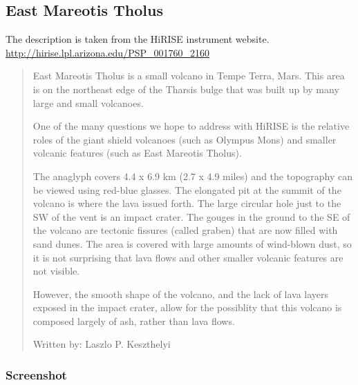 \subsection{East Mareotis Tholus}

The description is taken from the HiRISE instrument website.
\url{http://hirise.lpl.arizona.edu/PSP_001760_2160}

\begin{quotation}
East Mareotis Tholus is a small volcano in Tempe Terra, Mars. This
area is on the northeast edge of the Tharsis bulge that was built up
by many large and small volcanoes.

One of the many questions we hope to address with HiRISE is the
relative roles of the giant shield volcanoes (such as Olympus Mons)
and smaller volcanic features (such as East Mareotis Tholus).

The anaglyph covers 4.4 x 6.9 km (2.7 x 4.9 miles) and the topography
can be viewed using red-blue glasses. The elongated pit at the summit
of the volcano is where the lava issued forth. The large circular hole
just to the SW of the vent is an impact crater. The gouges in the
ground to the SE of the volcano are tectonic fissures (called graben)
that are now filled with sand dunes. The area is covered with large
amounts of wind-blown dust, so it is not surprising that lava flows
and other smaller volcanic features are not visible.

However, the smooth shape of the volcano, and the lack of lava layers
exposed in the impact crater, allow for the possiblity that this
volcano is composed largely of ash, rather than lava flows.

Written by: Laszlo P. Keszthelyi
\end{quotation}

\subsubsection*{Screenshot}

